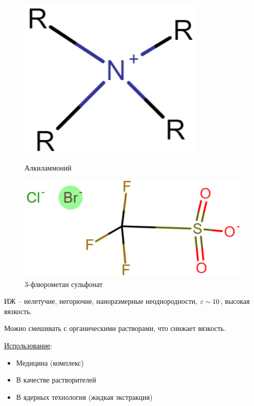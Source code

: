 \begin{lecture}
\begin{lecSection}
		\begin{figure}[h]
			\begin{minipage}{0.48\linewidth}
				\centering\includegraphics[width=0.7\linewidth]{lecture_11/alkil_ammon}
				\caption{Алкиламмоний}
				\label{fig:11:alkilammon}
			\end{minipage}
			\begin{minipage}{0.48\linewidth}
				\centering\includegraphics[width=\linewidth]{lecture_11/pic3}
				\caption{3-флюрометан сульфонат}
				\label{fig:11:metan_sulfonat}
			\end{minipage}
		\end{figure}
	
		ИЖ -- нелетучие, негорючие, наноразмерные неоднородности, $ \varepsilon \sim 10 $, высокая вязкость.
		
		Можно смешивать с органическими растворами, что снижает вязкость.
		
		\underline{Использование}:
		\begin{itemize}
			\item Медицина (комплекс)
			\item В качестве растворителей
			\item В ядерных технология (жидкая экстракция)
		\end{itemize}
	

\end{lecSection}
\end{lecture}
